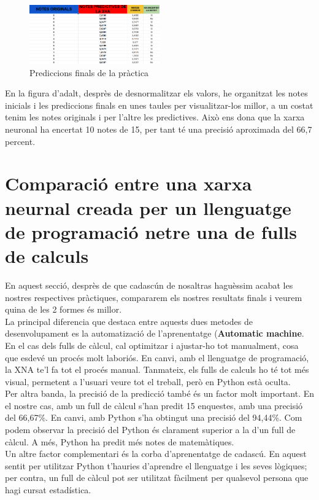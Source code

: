 \begin{figure}[H]
    \centering
    \includegraphics[width=0.5\textwidth]{./figures/Resultat_final.png}
    \caption{Prediccions finals de la pràctica}
\end{figure}

En la figura d'adalt, desprès de desnormalitzar els valors, he organitzat les notes inicials i les prediccions finals en unes taules per visualitzar-los millor, a un costat tenim les notes originals i per l'altre les predictives.
 Això ens dona que la xarxa neuronal ha encertat 10 notes de 15, per tant té una precisió aproximada del 66,7 percent.

\section{Comparació entre una xarxa neurnal creada per un llenguatge de programació netre una de fulls de calculs}
En aquest secció, desprès de que cadascún de nosaltras haguèssim acabat les nostres respectives pràctiques, compararem els nostres resultats finals i veurem quina de les 2 formes és millor.\\

La principal diferencia que destaca entre aquests dues metodes de desenvolupament es la automatizació de l'aprenentatge (\textbf{Automatic machine}. En el cas dels fulls de càlcul, cal optimitzar i ajustar-ho tot manualment, cosa que esdevé un procés molt laboriós. En canvi, amb el llenguatge de programació, la XNA te'l fa tot el procés manual. Tanmateix, els fulls de calculs ho té tot més visual, permetent a l'usuari veure tot el treball, però en Python està oculta.\\

Per altra banda, la precisió de la predicció també és un factor molt important. En el nostre cas, amb un full de càlcul s’han predit 15 enquestes, amb una precisió del 66,67\%. En canvi, amb Python s’ha obtingut una precisió del 94,44\%. Com podem observar la precisió del Python és clarament superior a la d'un full de càlcul. A més, Python ha predit més notes de matemàtiques.\\

Un altre factor complementari és la corba d'aprenentatge de cadascú. En aquest sentit per utilitzar Python t'hauries d'aprendre el llenguatge i les seves lògiques; per contra, un full de càlcul pot ser utilitzat fàcilment per qualsevol persona que hagi cursat estadística.\\


